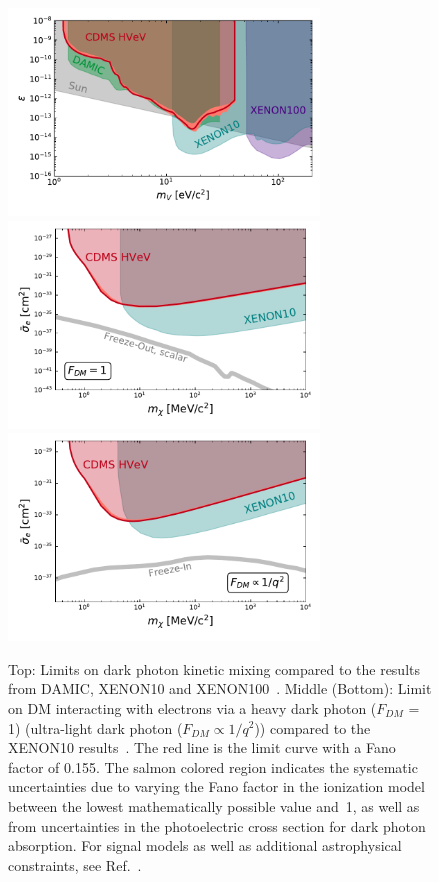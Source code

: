 \documentclass[%
reprint,
superscriptaddress,
preprintnumbers,
amsmath,amssymb,
prl,
aps,
floatfix
]{revtex4-1}
\begin{document}
\begin{figure}[ht!]
\includegraphics[width=3.25in]{epsilon_final.pdf}
\includegraphics[width=3.25in]{sigmae_FDM1_final.pdf}
\includegraphics[width=3.25in]{sigmae_FDMq2_final.pdf}
\caption{Top: Limits on dark photon kinetic mixing compared to the results from DAMIC, XENON10 and XENON100~\cite[ and references therein]{damic}. Middle (Bottom): Limit on DM interacting with electrons via a heavy dark photon ($F_{DM}$ = 1) (ultra-light dark photon ($F_{DM} \propto 1/q^2$)) compared to the XENON10 results~\cite{Xenon10}. The red line is the limit curve with a Fano factor of 0.155. The salmon colored region indicates the systematic uncertainties due to varying the Fano factor in the ionization model between the lowest mathematically possible value and~1, as well as from uncertainties in the photoelectric cross section for dark photon absorption. For signal models as well as additional astrophysical constraints, see Ref.~\cite{CosmicVisions}.}
\label{fig:limits}
\end{figure}
\end{document}
